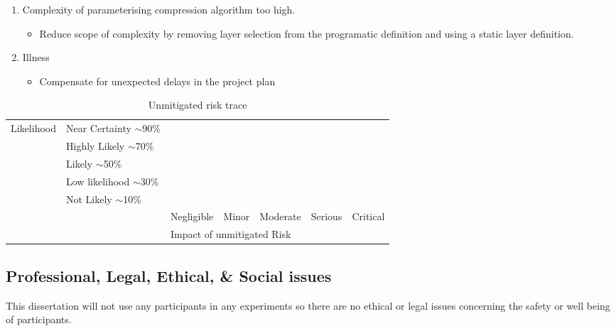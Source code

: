 \documentclass[../../D1.tex]{subfiles}
\begin{document}
\begin{enumerate}
    \item Complexity of parameterising compression algorithm too high.
    \begin{itemize}
        \item Reduce scope of complexity by removing layer selection from the programatic definition and using a static layer definition.
    \end{itemize}

    \item Illness
    \begin{itemize}
        \item Compensate for unexpected delays in the project plan
    \end{itemize}
\end{enumerate}


\begin{table}[]
    \begin{tabular}{@{}|l|l|l|l|l|l|l|@{}}
        \toprule
        \multirow{7}{*}{Likelihood} & Near Certainty $\sim$90\% &            &       &          &         &          \\ \cmidrule(l){2-7} 
                                    & Highly Likely $\sim$70\%  &            &       &          &         &          \\ \cmidrule(l){2-7} 
                                    & Likely $\sim$50\%         &            &       &          &         &          \\ \cmidrule(l){2-7} 
                                    & Low likelihood $\sim$30\% &            &       &          &         &          \\ \cmidrule(l){2-7} 
                                    & Not Likely $\sim$10\%     &            &       &          &         &          \\ \cmidrule(l){2-7} 
                                    & \multirow{2}{*}{}         & Negligible & Minor & Moderate & Serious & Critical \\ \cmidrule(l){3-7} 
                                    &                           & \multicolumn{5}{l|}{Impact of unmitigated Risk}  \\ \bottomrule
        \end{tabular}
    \caption{Unmitigated risk trace}
\end{table}




\subsection{Professional, Legal, Ethical, \& Social issues}
This dissertation will not use any participants in any experiments so there are no ethical or legal issues concerning the safety or well being of participants.
\end{document}
